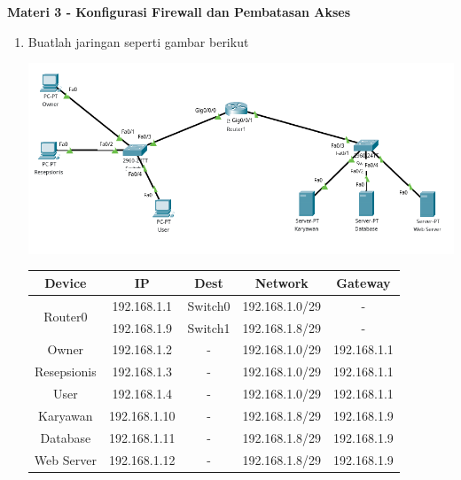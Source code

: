 \documentclass{article}
\begin{document}
    \newpage
    \begin{flushleft}
        \textbf{Materi 3 - Konfigurasi Firewall dan Pembatasan Akses}
        \newline

        \begin{enumerate}
            \item Buatlah jaringan seperti gambar berikut

            \begin{center}
                \includegraphics[scale=0.4]{3-1.png}
            \end{center}

            \begin{tabular}{|c|c|c|c|c|}
                \hline
                Device & IP & Dest & Network & Gateway \\
                \hline
                \multirow{2}{4em}{Router0} & 192.168.1.1 & Switch0 & 192.168.1.0/29 & - \\
                & 192.168.1.9 & Switch1 & 192.168.1.8/29 & - \\
                \hline
                Owner & 192.168.1.2 & - & 192.168.1.0/29 & 192.168.1.1\\
                \hline
                Resepsionis & 192.168.1.3 & - & 192.168.1.0/29 & 192.168.1.1\\
                \hline
                User & 192.168.1.4 & - & 192.168.1.0/29 & 192.168.1.1\\
                \hline
                Karyawan & 192.168.1.10 & - & 192.168.1.8/29 & 192.168.1.9\\
                \hline
                Database & 192.168.1.11 & - & 192.168.1.8/29 & 192.168.1.9\\
                \hline
                Web Server & 192.168.1.12 & - & 192.168.1.8/29 & 192.168.1.9\\
                \hline
            \end{tabular}


\end{enumerate}
\end{flushleft}
\end{document}
